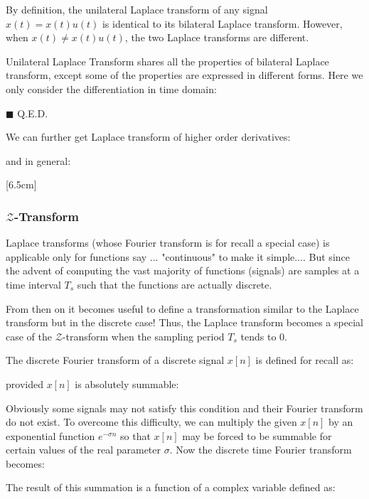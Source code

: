 	By definition, the unilateral Laplace transform of any signal $x(t)=x(t)u(t)$ is identical to its bilateral Laplace transform. However, when $x(t) \ne x(t)u(t)$, the two Laplace transforms are different. 
	
	\label{properties of unilateral Laplace Transform}Unilateral Laplace Transform shares all the properties of bilateral Laplace transform, except some of the properties are expressed in different forms. Here we only consider the differentiation in time domain:
	
	\begin{dem}
	
	\begin{flushright}
		$\blacksquare$  Q.E.D.
	\end{flushright}
	\end{dem}
	We can further get Laplace transform of higher order derivatives:
	
	and in general:
	

	[6.5cm]
	
	\pagebreak
	\subsubsection{$\mathcal{Z}$-Transform}
	Laplace transforms (whose Fourier transform is for recall a special case) is applicable only for functions say ... "continuous" to make it simple.... But since the advent of computing the vast majority of functions (signals) are samples at a time interval $T_s$ such that the functions are actually discrete.

	From then on it becomes useful to define a transformation similar to the Laplace transform but in the discrete case! Thus, the Laplace transform becomes a special case of the $\mathcal{Z}$-transform when the sampling period $T_s$ tends to $0$.

	The discrete Fourier transform of a discrete signal $x[n]$ is defined for recall as:
	
	provided $x[n]$ is absolutely summable:
	
	Obviously some signals may not satisfy this condition and their Fourier transform do not exist. To overcome this difficulty, we can multiply the given $x[n]$ by an exponential function $e^{-\sigma n}$ so that $x[n]$ may be forced to be summable for certain values of the real parameter $\sigma$. Now the discrete time Fourier transform becomes:
	
	The result of this summation is a function of a complex variable defined as:
	
